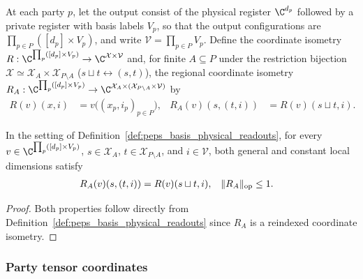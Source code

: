 \begin{definition}
    \label{def:peps_basis_physical_readouts}
    \leanok
    At each party $p$, let the output consist of the physical register $\C^{d_p}$ followed by a private register with basis labels $V_p$, so that the output configurations are $\prod_{p\in P}([d_p]\times V_p)$, and write $\mathcal V=\prod_{p\in P}V_p$. Define the coordinate isometry $R:\C^{\prod_p([d_p]\times V_p)}\to\C^{\mathcal X\times\mathcal V}$ and, for finite $A\subseteq P$ under the restriction bijection $\mathcal X\simeq\mathcal X_A\times\mathcal X_{P\setminus A}$ ($s\sqcup t\leftrightarrow(s,t)$), the regional coordinate isometry $R_A:\C^{\prod_p([d_p]\times V_p)}\to\C^{\mathcal X_A\times(\mathcal X_{P\setminus A}\times\mathcal V)}$ by
    \begin{align}
        R(v)(x,i)       & = v\bigl((x_p,i_p)_{p\in P}\bigr), &
        R_A(v)(s,(t,i)) & = R(v)(s\sqcup t,i).
    \end{align}
\end{definition}

\begin{lemma}
    \label{thm:peps_basis_regional_readouts}
    \leanok
    In the setting of Definition~\ref{def:peps_basis_physical_readouts}, for every $v\in\C^{\prod_p([d_p]\times V_p)}$, $s\in\mathcal X_A$, $t\in\mathcal X_{P\setminus A}$, and $i\in\mathcal V$, both general and constant local dimensions satisfy
    \begin{align}
        R_A(v)(s,(t,i))  & = R(v)(s\sqcup t,i), &
        \|R_A\|_{\rm op} & \le 1. \notag
    \end{align}
\end{lemma}

\begin{proof}
    \leanok
    Both properties follow directly from Definition~\ref{def:peps_basis_physical_readouts} since $R_A$ is a reindexed coordinate isometry.
\end{proof}

\subsubsection{Party tensor coordinates}

